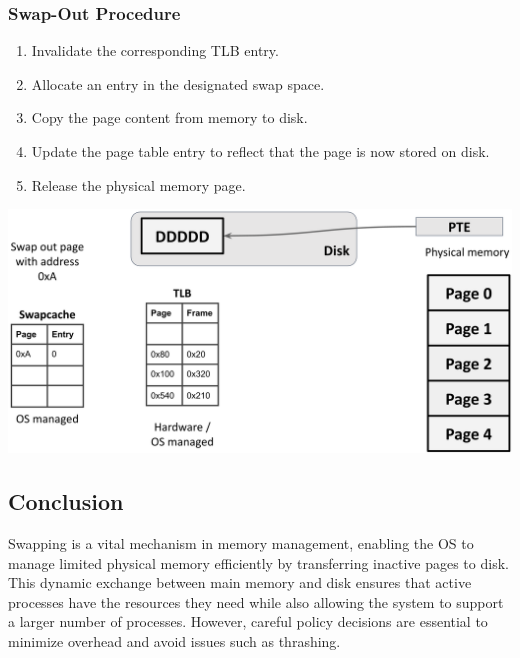\subsubsection{Swap-Out Procedure}
\noindent
\begin{minipage}{0.45\textwidth}
\begin{enumerate}
    \item Invalidate the corresponding TLB entry.
    \item Allocate an entry in the designated swap space.
    \item Copy the page content from memory to disk.
    \item Update the page table entry to reflect that the page is now stored on disk.
    \item Release the physical memory page.
\end{enumerate}
\end{minipage}%
\hfill
\begin{minipage}{0.45\textwidth}
\begin{center}
  \includegraphics[width=1.1\textwidth]{chapters/L5/images/swapout.png}
\end{center}
\end{minipage}

\subsection{Conclusion}
Swapping is a vital mechanism in memory management, enabling the OS to manage limited physical memory efficiently by transferring inactive pages to disk. This dynamic exchange between main memory and disk ensures that active processes have the resources they need while also allowing the system to support a larger number of processes. However, careful policy decisions are essential to minimize overhead and avoid issues such as thrashing.
